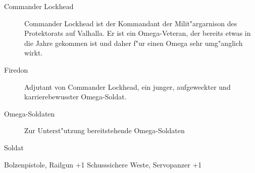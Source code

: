 
\begin{description}
    \item[Commander Lockhead] Commander Lockhead ist der Kommandant der Milit"argarnison des Protektorats auf Valhalla. Er ist ein 
        Omega-Veteran, der bereits etwas in die Jahre gekommen ist und daher f"ur einen Omega sehr umg"anglich wirkt.
    \item[Firedon] Adjutant von Commander Lockhead, ein junger, aufgeweckter und karrierebewusster Omega-Soldat.
    \item[Omega-Soldaten] Zur Unterst"utzung bereitstehende Omega-Soldaten
\end{description}

\begin{nscsheet}{Soldat}
    \nscstats[ATT=3,AGG=2,CON=2]
    \nscruler
    \begin{nscinventory}
        \nscitem[Waffen] Bolzenpistole, Railgun +1
        \nscitem[R"ustung] Schusssichere Weste, Servopanzer +1
    \end{nscinventory}
\end{nscsheet}
